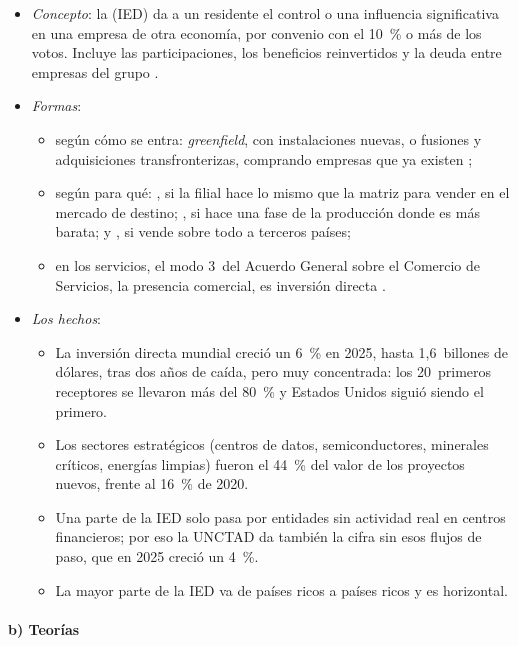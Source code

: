 \documentclass[11pt]{article}
\begin{document}
\begin{itemize}
\item \emph{Concepto}: la  (IED) da a un residente el control o una influencia significativa en una empresa de otra economía, por convenio con el 10~\% o más de los votos. Incluye las participaciones, los beneficios reinvertidos y la deuda entre empresas del grupo\nocite{FMI2009MBP6} .
\item \emph{Formas}:
  \begin{itemize}
  \item según cómo se entra: \emph{greenfield}, con instalaciones nuevas, o fusiones y adquisiciones transfronterizas, comprando empresas que ya existen ;
  \item según para qué: , si la filial hace lo mismo que la matriz para vender en el mercado de destino; , si hace una fase de la producción donde es más barata; y , si vende sobre todo a terceros países\nocite{Ekholm2007Platform};
  \item en los servicios, el modo 3~del Acuerdo General sobre el Comercio de Servicios, la presencia comercial, es inversión directa .
  \end{itemize}
\item \emph{Los hechos}:
  \begin{itemize}
  \item La inversión directa mundial creció un 6~\% en 2025, hasta 1,6~billones de dólares, tras dos años de caída, pero muy concentrada: los 20~primeros receptores se llevaron más del 80~\% y Estados Unidos siguió siendo el primero\nocite{UNCTAD2026WIR}.
  \item Los sectores estratégicos (centros de datos, semiconductores, minerales críticos, energías limpias) fueron el 44~\% del valor de los proyectos nuevos, frente al 16~\% de 2020\nocite{UNCTAD2026WIR}.
  \item Una parte de la IED solo pasa por entidades sin actividad real en centros financieros; por eso la UNCTAD da también la cifra sin esos flujos de paso, que en 2025 creció un 4~\%\nocite{UNCTAD2026WIR}.
  \item La mayor parte de la IED va de países ricos a países ricos y es horizontal\nocite{Carr2001Estimating}.
  \end{itemize}
\end{itemize}

\paragraph{b) Teorías}
\end{document}
